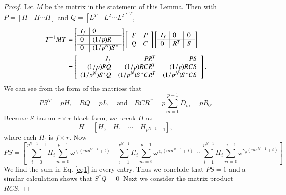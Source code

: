 \documentclass[preprint,12pt]{elsarticle}
\theoremstyle{definition}
\theoremstyle{remark}
\begin{document}
\begin{proof}
Let $M$ be the matrix in the statement of this Lemma.  Then with $P = \left[ H \quad H \cdots H\right]$ and
$Q = [ L^T \quad L^T \cdots L^T]^T$,
\begin{align}
T^{-1}MT &= \left[\begin{array}{l | l  }
I_f & 0 \\\hline
0 & (1/p)R \\\hline
 0 & (1/p^N)S^*   \\
\end{array}\right]
\left[\begin{array}{rr} F & P \\ Q & C \end{array}\right]
 \left[\begin{array}{l | l | l}
I_f & 0 & 0 \\\hline
 0& R^T & S \\
\end{array}\right] \nonumber \\
&=\left[\begin{array}{rrr} I_f & PR^T & PS \\(1/p)RQ  & (1/p)RCR^T & (1/p)RCS\\ (1/p^N)S^*Q & (1/p^N) S^*CR^T & (1/p^N)S^*CS \end{array}\right].\label{blocks}
\end{align}
We can see from the form of the matrices that $$PR^T=pH, \quad RQ=pL, \quad \text{and} \quad RCR^T=p\sum_{m=0}^{p-1}{D_m}=pB_0.$$
Because $S$ has an $r\times r$ block form, we break $H$ as $$H=\left[ H_0 \quad H_1 \quad \cdots \quad H_{p^{N-1}-1}\right],$$ where each $H_i$ is $f\times r$.  Now $$PS=\left[ \sum_{i=0}^{p^{N-1}-1}H_i\sum_{m=0}^{p-1}\omega^{\gamma_1 (mp^{N-1}+i)} \quad \sum_{i=1}^{p^{N-1}}H_i\sum_{m=0}^{p-1}\omega^{\gamma_2 (mp^{N-1}+i)} \  \cdots \ \sum_{i=1}^{p^{N-1}}H_i\sum_{m=0}^{p-1}\omega^{\gamma_\rho (mp^{N-1}+i)}\right]$$
We find the sum in Eq. \ref{eq1} in every entry. Thus we conclude that $PS=0$ and a similar calculation shows that $S^*Q=0$. Next we consider the matrix product $RCS$.

\end{proof}
\end{document}
